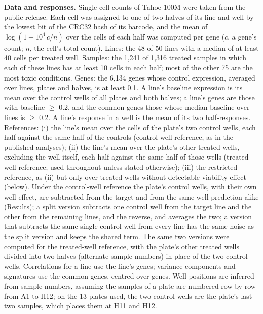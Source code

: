 \documentclass[pdflatex,sn-nature]{sn-jnl}
\begin{document}
\textbf{Data and responses.} Single-cell counts of Tahoe-100M were taken from the public release\cite{zhang2026}. Each cell was assigned to one of two halves of its line and well by the lowest bit of the CRC32 hash of its barcode, and the mean of $\log(1+10^4\,c/n)$ over the cells of each half was computed per gene ($c$, a gene's count; $n$, the cell's total count). Lines: the 48 of 50 lines with a median of at least 40 cells per treated well. Samples: the 1,241 of 1,316 treated samples in which each of these lines has at least 10 cells in each half; most of the other 75 are the most toxic conditions. Genes: the 6,134 genes whose control expression, averaged over lines, plates and halves, is at least 0.1. A line's baseline expression is its mean over the control wells of all plates and both halves; a line's genes are those with baseline $\geq$ 0.2, and the common genes those whose median baseline over lines is $\geq$ 0.2. A line's response in a well is the mean of its two half-responses. References: (i) the line's mean over the cells of the plate's two control wells, each half against the same half of the controls (control-well reference, as in the published analyses); (ii) the line's mean over the plate's other treated wells, excluding the well itself, each half against the same half of those wells (treated-well reference; used throughout unless stated otherwise); (iii) the restricted reference, as (ii) but only over treated wells without detectable viability effect (below). Under the control-well reference the plate's control wells, with their own well effect, are subtracted from the target and from the same-well prediction alike (Results); a split version subtracts one control well from the target line and the other from the remaining lines, and the reverse, and averages the two; a version that subtracts the same single control well from every line has the same noise as the split version and keeps the shared term. The same two versions were computed for the treated-well reference, with the plate's other treated wells divided into two halves (alternate sample numbers) in place of the two control wells. Correlations for a line use the line's genes; variance components and signatures use the common genes, centred over genes. Well positions are inferred from sample numbers, assuming the samples of a plate are numbered row by row from A1 to H12; on the 13 plates used, the two control wells are the plate's last two samples, which places them at H11 and H12.
\end{document}
